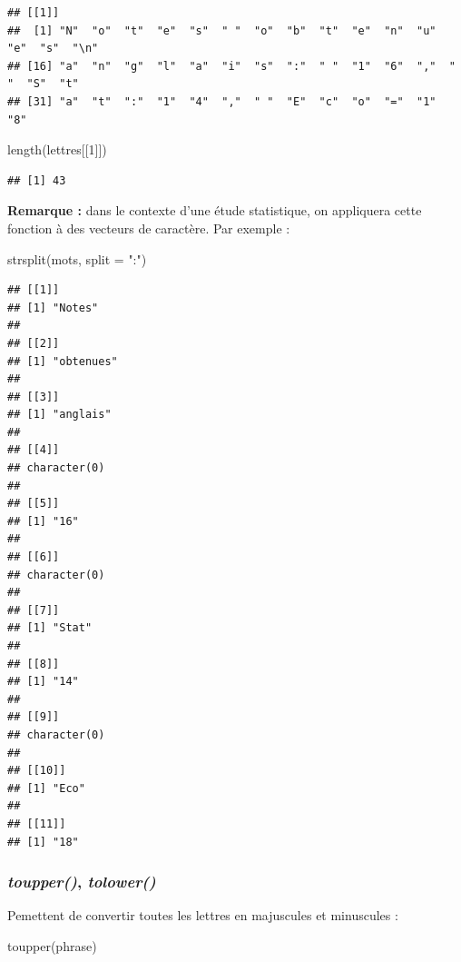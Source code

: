\documentclass[
]{book}
\newenvironment{Shaded}{\begin{snugshade}}{\end{snugshade}}
\newcommand{\AttributeTok}[1]{\textcolor[rgb]{0.77,0.63,0.00}{#1}}
\newcommand{\DecValTok}[1]{\textcolor[rgb]{0.00,0.00,0.81}{#1}}
\newcommand{\FunctionTok}[1]{\textcolor[rgb]{0.00,0.00,0.00}{#1}}
\newcommand{\NormalTok}[1]{#1}
\newcommand{\StringTok}[1]{\textcolor[rgb]{0.31,0.60,0.02}{#1}}
\theoremstyle{definition}
\theoremstyle{definition}
\theoremstyle{definition}
\theoremstyle{definition}
\theoremstyle{remark}
\begin{document}
\begin{verbatim}
## [[1]]
##  [1] "N"  "o"  "t"  "e"  "s"  " "  "o"  "b"  "t"  "e"  "n"  "u"  "e"  "s"  "\n"
## [16] "a"  "n"  "g"  "l"  "a"  "i"  "s"  ":"  " "  "1"  "6"  ","  " "  "S"  "t" 
## [31] "a"  "t"  ":"  "1"  "4"  ","  " "  "E"  "c"  "o"  "="  "1"  "8"
\end{verbatim}

\begin{Shaded}
\begin{Highlighting}[]
\FunctionTok{length}\NormalTok{(lettres[[}\DecValTok{1}\NormalTok{]])}
\end{Highlighting}
\end{Shaded}

\begin{verbatim}
## [1] 43
\end{verbatim}

\textbf{Remarque :} dans le contexte d'une étude statistique, on appliquera cette fonction à des vecteurs de caractère. Par exemple :

\begin{Shaded}
\begin{Highlighting}[]
\FunctionTok{strsplit}\NormalTok{(mots, }\AttributeTok{split =} \StringTok{":"}\NormalTok{)}
\end{Highlighting}
\end{Shaded}

\begin{verbatim}
## [[1]]
## [1] "Notes"
## 
## [[2]]
## [1] "obtenues"
## 
## [[3]]
## [1] "anglais"
## 
## [[4]]
## character(0)
## 
## [[5]]
## [1] "16"
## 
## [[6]]
## character(0)
## 
## [[7]]
## [1] "Stat"
## 
## [[8]]
## [1] "14"
## 
## [[9]]
## character(0)
## 
## [[10]]
## [1] "Eco"
## 
## [[11]]
## [1] "18"
\end{verbatim}

\hypertarget{toupper-tolower}{%
\subsubsection{\texorpdfstring{\emph{toupper()}, \emph{tolower()}}{toupper(), tolower()}}\label{toupper-tolower}}

Pemettent de convertir toutes les lettres en majuscules et minuscules :

\begin{Shaded}
\begin{Highlighting}[]
\FunctionTok{toupper}\NormalTok{(phrase)}
\end{Highlighting}
\end{Shaded}
\end{document}
